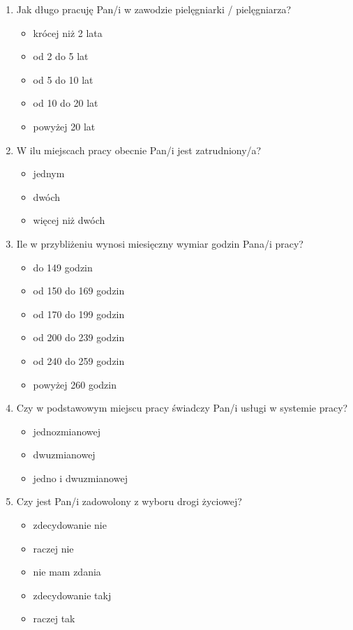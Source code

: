 \documentclass[a4paper,12pt,twoside,openright]{mwrep}
\begin{document}
\begin{enumerate}[label=\arabic*)]
		\item{Jak długo pracuję  Pan/i w zawodzie pielęgniarki / pielęgniarza?}
		\begin{itemize}
			\item{krócej niż 2 lata}
			\item{od 2 do 5 lat}
			\item{od 5 do 10 lat}
			\item{od 10 do 20 lat}
			\item{powyżej 20 lat}
		\end{itemize}
		\vspace{\baselineskip} 
		
		\item{W ilu miejscach pracy obecnie Pan/i jest zatrudniony/a?}
		\begin{itemize}
			\item{jednym}
			\item{dwóch}
			\item{więcej niż dwóch}
		\end{itemize}
		\vspace{\baselineskip} 
		
		\item{Ile w przybliżeniu wynosi miesięczny wymiar godzin Pana/i pracy?}
		\begin{itemize}
			\item{do 149 godzin}
			\item{od 150 do 169 godzin}
			\item{od 170 do 199 godzin}
			\item{od 200 do 239 godzin}
			\item{od 240 do 259 godzin}
			\item{powyżej 260 godzin}
		\end{itemize}
		\vspace{\baselineskip} 
		
		\item{Czy w podstawowym miejscu pracy świadczy Pan/i usługi w systemie pracy?}
		\begin{itemize}
			\item{jednozmianowej}
			\item{dwuzmianowej}
			\item{jedno i dwuzmianowej}
		\end{itemize}
		\vspace{\baselineskip} 
		
		\item{Czy jest Pan/i zadowolony z wyboru drogi życiowej?}
		\begin{itemize}
			\item{zdecydowanie nie}
			\item{raczej nie}
			\item{nie mam zdania}
			\item{zdecydowanie takj}
			\item{raczej tak}
		\end{itemize}
		\vspace{\baselineskip} 
		

\end{enumerate}
\end{document}
